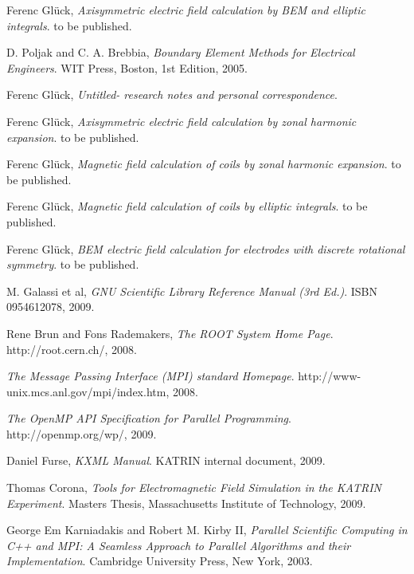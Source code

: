 \documentclass[11pt,a4paper,oneside]{article}
\begin{document}
\begin{thebibliography}{99}

	  Ferenc Gl\"{u}ck,
	  \emph{Axisymmetric electric field calculation by BEM and elliptic integrals}.
	  to be published.

	  D. Poljak and C. A. Brebbia,
	  \emph{Boundary Element Methods for Electrical Engineers}.
	  WIT Press, Boston,
	  1st Edition,
	  2005.

	  Ferenc Gl\"{u}ck,
	  \emph{Untitled- research notes and personal correspondence}.

	  Ferenc Gl\"{u}ck,
	  \emph{Axisymmetric electric field calculation by zonal harmonic expansion}.
	  to be published.

	  Ferenc Gl\"{u}ck,
	  \emph{Magnetic field calculation of coils by zonal harmonic expansion}.
	  to be published.

	  Ferenc Gl\"{u}ck,
	  \emph{Magnetic field calculation of coils by elliptic integrals}.
	  to be published.

	  Ferenc Gl\"{u}ck,
	  \emph{BEM electric field calculation for electrodes with discrete rotational symmetry}.
	  to be published.

	  M. Galassi et al,
	  \emph{GNU Scientific Library Reference Manual (3rd Ed.)}.
	  ISBN 0954612078,
	  2009.

	  Rene Brun and Fons Rademakers,
	  \emph{The ROOT System Home Page}.
	  http://root.cern.ch/,
	  2008.

	  \emph{The Message Passing Interface (MPI) standard Homepage}.
	  http://www-unix.mcs.anl.gov/mpi/index.htm,
	  2008.

	  \emph{The OpenMP API Specification for Parallel Programming}.
	  http://openmp.org/wp/,
	  2009.

	  Daniel Furse,
	  \emph{KXML Manual}.
	  KATRIN internal document,
	  2009.

	  Thomas Corona,
	  \emph{Tools for Electromagnetic Field Simulation in the KATRIN Experiment}.
	  Masters Thesis, Massachusetts Institute of Technology,
	  2009.

	  George Em Karniadakis and Robert M. Kirby II,
	  \emph{Parallel Scientific Computing in C++ and MPI: A Seamless Approach to Parallel Algorithms and their Implementation}.
	  Cambridge University Press, New York,
	  2003.

\end{thebibliography}
\end{document}
